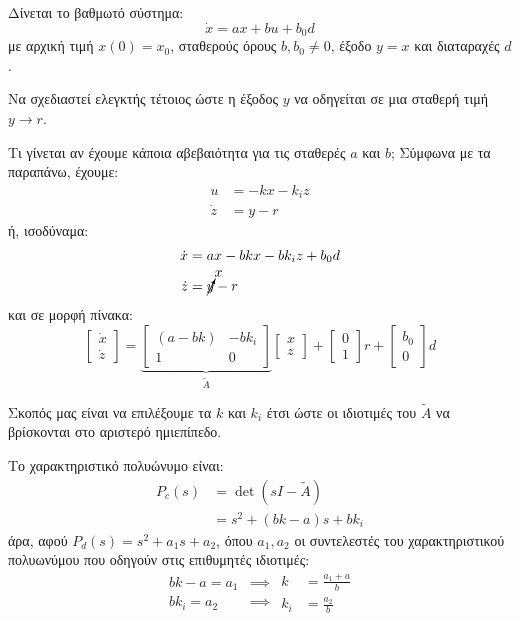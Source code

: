 \documentclass[11pt,a4paper,notitlepage,fleqn]{article}
\begin{document}
\begin{exercise}
	Δίνεται το βαθμωτό σύστημα:\[
	\dot x = ax+bu+b_0d
	\]
	με αρχική τιμή \( x(0) = x_0 \), σταθερούς όρους \( b,b_0\neq 0 \),
	έξοδο \( y=x \) και διαταραχές \( d \).

	Να σχεδιαστεί ελεγκτής τέτοιος ώστε η έξοδος \( y \) να οδηγείται
	σε μια σταθερή τιμή \( y\to r \).

	Τι γίνεται αν έχουμε κάποια αβεβαιότητα για τις σταθερές
	\( a \) και \( b \);
	\tcblower
	Σύμφωνα με τα παραπάνω, έχουμε:
	\begin{align*}
		u &= -kx - k_i z\\
		\dot z &= y-r
	\end{align*}
	ή, ισοδύναμα:
	\begin{align*}
		\dot x &= ax - bkx - bk_i z + b_0 d \\
		\dot z &= \cancelto{x}{y}-r
	\end{align*}
	και σε μορφή πίνακα:
	\[
	\left[\begin{matrix}
	\dot x \\ \dot z
	\end{matrix}\right]
	= \underbrace{\left[\begin{matrix}
		(a-bk) & -bk_i \\ 1 & 0
		\end{matrix}\right]}_{\tilde A}\left[\begin{matrix}
	x \\ z
	\end{matrix}\right] + \left[\begin{matrix}
	0 \\ 1
	\end{matrix}\right]r + \left[\begin{matrix}
	b_0 \\ 0
	\end{matrix}\right]d
	\]

	Σκοπός μας είναι να επιλέξουμε τα \( k \) και \( k_i \) έτσι ώστε
	οι ιδιοτιμές του \( \tilde A \) να βρίσκονται στο αριστερό ημιεπίπεδο.

	Το χαρακτηριστικό πολυώνυμο είναι:
	\begin{align*}
	 P_c(s) &= \det(sI-\tilde A)
		\\ &= s^2 + (bk-a)s + bk_i
	\end{align*}
	άρα, αφού \( P_d(s) = s^2+a_1s+a_2 \), όπου \( a_1,a_2 \) οι
	συντελεστές του χαρακτηριστικού πολυωνύμου που οδηγούν
	στις επιθυμητές ιδιοτιμές:
	\[ \begin{aligned}
		bk-a = a_1 &\implies \\
		bk_i = a_2 &\implies
		\end{aligned}\boxed{\begin{aligned}
			k &= \frac{a_1+a}{b} \\
			k_i &= \frac{a_2}{b}
			\end{aligned}}
	\]


\end{exercise}
\end{document}
